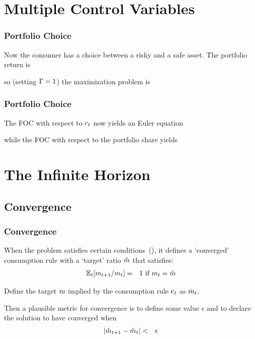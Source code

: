 \documentclass{beamer}
\providecommand{\Ex}{\ensuremath{\mathbb{E}}} %
\begin{document}
\section{Multiple Control Variables}
\begin{frame}
\frametitle{Portfolio Choice}

Now the consumer has a choice between a risky and a safe asset.  \pause The portfolio
return is

\pause so (setting $\Gamma=1$) the maximization problem is \pause 


\end{frame}

\begin{frame}
\frametitle{Portfolio Choice}

The FOC with respect to $c_{t}$ now yields an Euler equation

\pause
while the FOC with respect to the portfolio share yields


\end{frame}

\section{The Infinite Horizon}
\subsection{Convergence}
\begin{frame}
\frametitle{Convergence}

When the problem satisfies certain conditions~(\cite{BufferStockTheory}),
it defines a `converged' consumption rule with a `target' ratio $\check{m}$
that satisfies:
\begin{eqnarray}
  \Ex_{t}[\mRat_{t+1}/\mRat_{t}] & = & 1 \text{~if $\mRat_{t} = \check{\mRat}$}
\end{eqnarray}

\pause 

Define the target $m$ implied by the consumption rule $\mathrm{c}_{t}$ as $\check{m}_{t}$.

\medskip\pause
Then a plausible metric for convergence is to define some value $\epsilon$ and to declare
the solution to have converged when
\begin{eqnarray}
  |\check{m}_{t+1}-\check{m}_{t}| & < & \epsilon
\end{eqnarray}

\end{frame}
\end{document}
